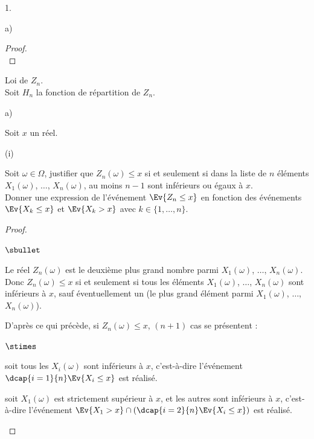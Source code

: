 \documentclass[11pt]{article}%
\begin{document}
\begin{noliste}{1.}
\begin{noliste}{a)}
\begin{proof}
      ~\\[-1.4cm]
    \end{proof}
  \end{noliste}
  
  
  
  
  \item Loi de $Z_n$.\\
  Soit $H_n$ la fonction de répartition de $Z_n$.
  \begin{noliste}{a)}
    \setlength{\itemsep}{2mm}
    \item Soit $x$ un réel.
    \begin{nonoliste}{(i)}
      \item Soit $\omega \in \Omega$, justifier que $Z_n(\omega) \leq x$
      si et seulement si dans la liste de $n$ éléments $X_1(\omega)$,
      $\ldots$, $X_n(\omega)$, au moins $n-1$ sont inférieurs ou égaux
      à $x$.\\
      Donner une expression de l'événement $\Ev{Z_n \leq x}$ en 
      fonction des événements $\Ev{X_k \leq x}$ et $\Ev{X_k >x}$ avec
      $k \in \{1, \ldots, n \}$.
      
      \begin{proof}~
        \begin{noliste}{$\sbullet$}
	  \item Le réel $Z_n(\omega)$ est le deuxième plus grand 
	  nombre parmi $X_1(\omega)$, $\ldots$, $X_n(\omega)$. Donc 
	  $Z_n(\omega) \leq x$ si et seulement si tous les éléments 
	  $X_1(\omega)$, $\ldots$, $X_n(\omega)$ sont inférieurs à 
	  $x$, sauf éventuellement un (le plus grand élément parmi
	  $X_1(\omega)$, $\ldots$, $X_n(\omega)$).
	  
	  
	  \item D'après ce qui précède, si $Z_n(\omega) \leq x$, 
	  $(n+1)$ cas se présentent :
        \end{noliste}
        \begin{liste}{$\stimes$}
          \item soit tous les $X_i(\omega)$ sont inférieurs à $x$, 
          c'est-à-dire l'événement $\dcap{i=1}{n} \Ev{X_i \leq x}$
          est réalisé.
          
          \item soit $X_1(\omega)$ est strictement 
          supérieur à $x$, et les autres sont inférieurs à $x$, 
          c'est-à-dire l'événement $\Ev{X_1 >x} \cap \left(
          \dcap{i=2}{n} \Ev{X_i \leq x}\right)$ est réalisé.
          

\end{liste}
\end{proof}
\end{nonoliste}
\end{noliste}
\end{noliste}
\end{document}
